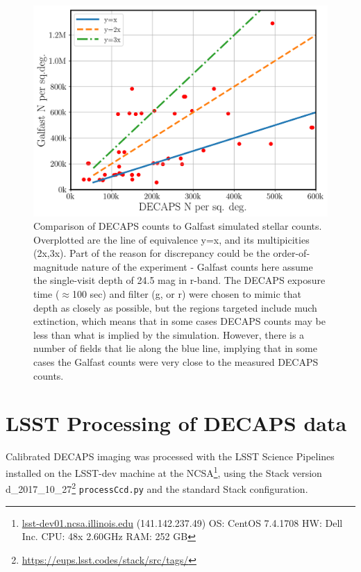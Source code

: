 \documentclass[DM,lsstdraft,toc,usenatbib,authoryear]{lsstdoc}
\begin{document}
\begin{figure}
\centering
\includegraphics[width=0.75\columnwidth]{figs/MAF_DECAPS_comparison.png}
\caption{Comparison of DECAPS counts to Galfast simulated stellar counts.  Overplotted are the line of equivalence y=x, and its multipicities (2x,3x). Part of the reason for discrepancy could be the order-of-magnitude nature of the experiment - Galfast counts here assume the single-visit depth of 24.5 mag in r-band. The DECAPS exposure time ($\approx$100 sec) and filter (g, or r) were chosen to mimic that depth as closely as possible, but the regions targeted include much extinction, which means that in some cases DECAPS counts may be less than what is  implied by the simulation. However, there is a number of fields that lie along the blue line, implying that in some cases the Galfast counts were very close to the measured DECAPS counts.}
\label{fig:maf_decaps_counts}
\end{figure}


\section{LSST Processing of DECAPS data}
\label{sec:LSST}
Calibrated DECAPS imaging was processed with the LSST Science Pipelines installed on the LSST-dev machine at the NCSA\footnote{\url{lsst-dev01.ncsa.illinois.edu} (141.142.237.49) OS: CentOS 7.4.1708   HW: Dell Inc. CPU: 48x 2.60GHz RAM: 252 GB}, using the Stack version d\_2017\_10\_27\footnote{\url{https://eups.lsst.codes/stack/src/tags/}} \verb|processCcd.py| and the standard Stack configuration.
\end{document}
